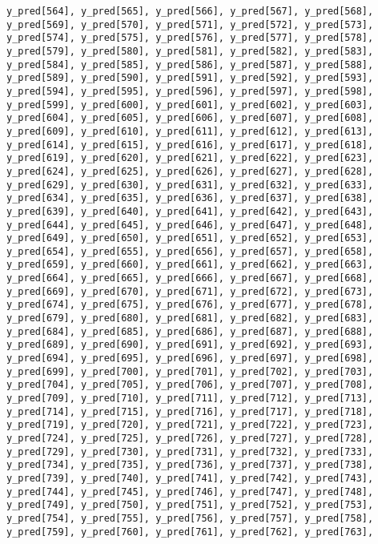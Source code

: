 \documentclass[
  letterpaper,
  DIV=11,
  numbers=noendperiod]{scrartcl}
\begin{document}
\begin{verbatim}
y_pred[564], y_pred[565], y_pred[566], y_pred[567], y_pred[568],
y_pred[569], y_pred[570], y_pred[571], y_pred[572], y_pred[573],
y_pred[574], y_pred[575], y_pred[576], y_pred[577], y_pred[578],
y_pred[579], y_pred[580], y_pred[581], y_pred[582], y_pred[583],
y_pred[584], y_pred[585], y_pred[586], y_pred[587], y_pred[588],
y_pred[589], y_pred[590], y_pred[591], y_pred[592], y_pred[593],
y_pred[594], y_pred[595], y_pred[596], y_pred[597], y_pred[598],
y_pred[599], y_pred[600], y_pred[601], y_pred[602], y_pred[603],
y_pred[604], y_pred[605], y_pred[606], y_pred[607], y_pred[608],
y_pred[609], y_pred[610], y_pred[611], y_pred[612], y_pred[613],
y_pred[614], y_pred[615], y_pred[616], y_pred[617], y_pred[618],
y_pred[619], y_pred[620], y_pred[621], y_pred[622], y_pred[623],
y_pred[624], y_pred[625], y_pred[626], y_pred[627], y_pred[628],
y_pred[629], y_pred[630], y_pred[631], y_pred[632], y_pred[633],
y_pred[634], y_pred[635], y_pred[636], y_pred[637], y_pred[638],
y_pred[639], y_pred[640], y_pred[641], y_pred[642], y_pred[643],
y_pred[644], y_pred[645], y_pred[646], y_pred[647], y_pred[648],
y_pred[649], y_pred[650], y_pred[651], y_pred[652], y_pred[653],
y_pred[654], y_pred[655], y_pred[656], y_pred[657], y_pred[658],
y_pred[659], y_pred[660], y_pred[661], y_pred[662], y_pred[663],
y_pred[664], y_pred[665], y_pred[666], y_pred[667], y_pred[668],
y_pred[669], y_pred[670], y_pred[671], y_pred[672], y_pred[673],
y_pred[674], y_pred[675], y_pred[676], y_pred[677], y_pred[678],
y_pred[679], y_pred[680], y_pred[681], y_pred[682], y_pred[683],
y_pred[684], y_pred[685], y_pred[686], y_pred[687], y_pred[688],
y_pred[689], y_pred[690], y_pred[691], y_pred[692], y_pred[693],
y_pred[694], y_pred[695], y_pred[696], y_pred[697], y_pred[698],
y_pred[699], y_pred[700], y_pred[701], y_pred[702], y_pred[703],
y_pred[704], y_pred[705], y_pred[706], y_pred[707], y_pred[708],
y_pred[709], y_pred[710], y_pred[711], y_pred[712], y_pred[713],
y_pred[714], y_pred[715], y_pred[716], y_pred[717], y_pred[718],
y_pred[719], y_pred[720], y_pred[721], y_pred[722], y_pred[723],
y_pred[724], y_pred[725], y_pred[726], y_pred[727], y_pred[728],
y_pred[729], y_pred[730], y_pred[731], y_pred[732], y_pred[733],
y_pred[734], y_pred[735], y_pred[736], y_pred[737], y_pred[738],
y_pred[739], y_pred[740], y_pred[741], y_pred[742], y_pred[743],
y_pred[744], y_pred[745], y_pred[746], y_pred[747], y_pred[748],
y_pred[749], y_pred[750], y_pred[751], y_pred[752], y_pred[753],
y_pred[754], y_pred[755], y_pred[756], y_pred[757], y_pred[758],
y_pred[759], y_pred[760], y_pred[761], y_pred[762], y_pred[763],

\end{verbatim}
\end{document}
